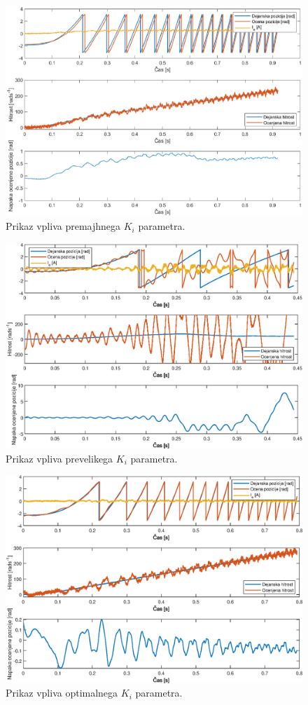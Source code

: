\documentclass[a4paper,twoside,openright,12pt,slovene]{book}
\begin{document}
\begin{figure}[!htbp]
    \centering
    \includegraphics[width=0.75\columnwidth]{Slike/PItuning_Ki_unstableLow.eps}
    \caption{\label{PItuning_Ki_unstableLow} Prikaz vpliva premajhnega $K_i$ parametra. }
\end{figure}

\begin{figure}[!htbp]
    \centering
    \includegraphics[width=0.75\columnwidth]{Slike/PItuning_Ki_unstableHigh.eps}
    \caption{\label{PItuning_Ki_unstableHigh} Prikaz vpliva prevelikega $K_i$ parametra. }
\end{figure}

\begin{figure}[!htbp]
    \centering
    \includegraphics[width=0.75\columnwidth]{Slike/PItuning_Ki_stable.eps}
    \caption{\label{PItuning_Ki_stable} Prikaz vpliva optimalnega $K_i$ parametra. }
\end{figure}
\end{document}
